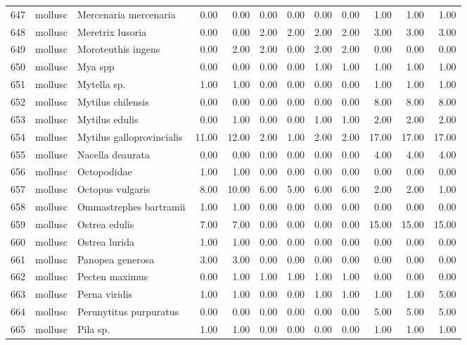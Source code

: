 \begin{table}[ht]
\begin{tabular}{rllrrrrrrrrr}
  647 & mollusc & Mercenaria mercenaria & 0.00 & 0.00 & 0.00 & 0.00 & 0.00 & 0.00 & 1.00 & 1.00 & 1.00 \\ 
  648 & mollusc & Meretrix lusoria & 0.00 & 0.00 & 2.00 & 2.00 & 2.00 & 2.00 & 3.00 & 3.00 & 3.00 \\ 
  649 & mollusc & Moroteuthis ingens & 0.00 & 2.00 & 2.00 & 0.00 & 2.00 & 2.00 & 0.00 & 0.00 & 0.00 \\ 
  650 & mollusc & Mya spp & 0.00 & 0.00 & 0.00 & 0.00 & 1.00 & 1.00 & 1.00 & 1.00 & 1.00 \\ 
  651 & mollusc & Mytella sp. & 1.00 & 1.00 & 0.00 & 0.00 & 0.00 & 0.00 & 1.00 & 1.00 & 1.00 \\ 
  652 & mollusc & Mytilus chilensis & 0.00 & 0.00 & 0.00 & 0.00 & 0.00 & 0.00 & 8.00 & 8.00 & 8.00 \\ 
  653 & mollusc & Mytilus edulis & 0.00 & 1.00 & 0.00 & 0.00 & 1.00 & 1.00 & 2.00 & 2.00 & 2.00 \\ 
  654 & mollusc & Mytilus galloprovincialis & 11.00 & 12.00 & 2.00 & 1.00 & 2.00 & 2.00 & 17.00 & 17.00 & 17.00 \\ 
  655 & mollusc & Nacella deaurata & 0.00 & 0.00 & 0.00 & 0.00 & 0.00 & 0.00 & 4.00 & 4.00 & 4.00 \\ 
  656 & mollusc & Octopodidae & 1.00 & 1.00 & 0.00 & 0.00 & 0.00 & 0.00 & 0.00 & 0.00 & 0.00 \\ 
  657 & mollusc & Octopus vulgaris & 8.00 & 10.00 & 6.00 & 5.00 & 6.00 & 6.00 & 2.00 & 2.00 & 1.00 \\ 
  658 & mollusc & Ommastrephes bartramii & 1.00 & 1.00 & 0.00 & 0.00 & 0.00 & 0.00 & 0.00 & 0.00 & 0.00 \\ 
  659 & mollusc & Ostrea edulis & 7.00 & 7.00 & 0.00 & 0.00 & 0.00 & 0.00 & 15.00 & 15.00 & 15.00 \\ 
  660 & mollusc & Ostrea lurida & 1.00 & 1.00 & 0.00 & 0.00 & 0.00 & 0.00 & 0.00 & 0.00 & 0.00 \\ 
  661 & mollusc & Panopea generosa & 3.00 & 3.00 & 0.00 & 0.00 & 0.00 & 0.00 & 0.00 & 0.00 & 0.00 \\ 
  662 & mollusc & Pecten maximus & 0.00 & 1.00 & 1.00 & 1.00 & 1.00 & 1.00 & 0.00 & 0.00 & 0.00 \\ 
  663 & mollusc & Perna viridis & 1.00 & 1.00 & 0.00 & 0.00 & 1.00 & 1.00 & 1.00 & 1.00 & 5.00 \\ 
  664 & mollusc & Perunytitus purpuratus & 0.00 & 0.00 & 0.00 & 0.00 & 0.00 & 0.00 & 5.00 & 5.00 & 5.00 \\ 
  665 & mollusc & Pila sp. & 1.00 & 1.00 & 0.00 & 0.00 & 0.00 & 0.00 & 1.00 & 1.00 & 1.00 \\ 

\end{tabular}
\end{table}
